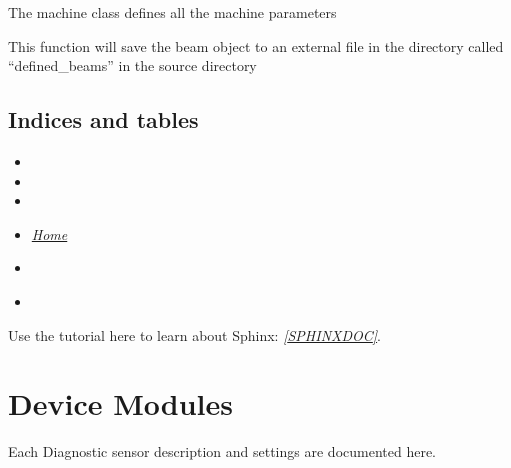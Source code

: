 \documentclass[letterpaper,10pt,english]{sphinxmanual}
\begin{document}

\begin{fulllineitems}
\label{machine:machine.staticmachine}
The machine class defines all the machine parameters

\begin{fulllineitems}
\label{machine:machine.staticmachine.save}
This function will save the beam object to an external file in the directory called ``defined\_beams'' in the source directory

\end{fulllineitems}


\end{fulllineitems}



\subsection{Indices and tables}
\label{machine:indices-and-tables}\begin{itemize}
\item {} 

\item {} 

\item {} 

\item {} 
{\hyperref[index::doc]{\emph{\emph{Home}}}}

\item {} 
{\hyperref[index:index-label]{\emph{}}}

\item {} 
{\hyperref[beam:beam-label]{\emph{}}}

\end{itemize}

Use the tutorial here to learn about Sphinx: \label{machine:id1}{\hyperref[machine:sphinxdoc]{\emph{{[}SPHINXDOC{]}}}}.


\section{Device Modules}
\label{device_modules:device-modules}\label{device_modules::doc}
Each Diagnostic sensor description and settings are documented here.
\end{document}
